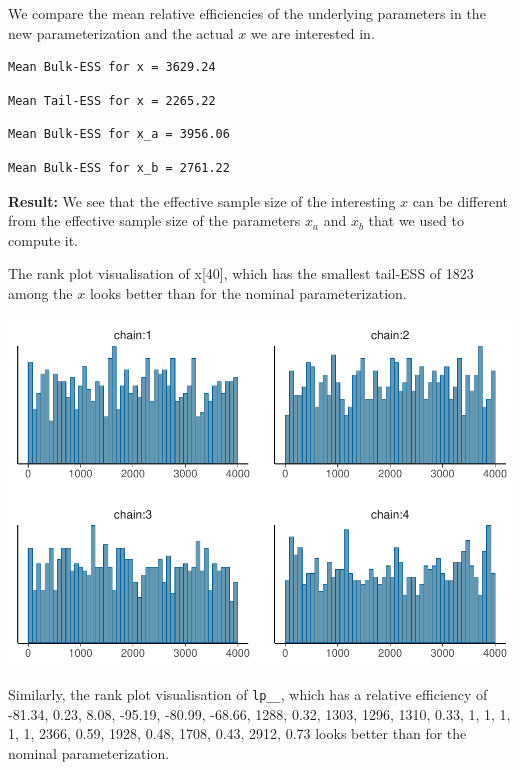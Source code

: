 \documentclass[american,]{article}
\begin{document}
We compare the mean relative efficiencies of the underlying parameters
in the new parameterization and the actual \(x\) we are interested in.

\begin{verbatim}
Mean Bulk-ESS for x = 3629.24
\end{verbatim}

\begin{verbatim}
Mean Tail-ESS for x = 2265.22
\end{verbatim}

\begin{verbatim}
Mean Bulk-ESS for x_a = 3956.06
\end{verbatim}

\begin{verbatim}
Mean Bulk-ESS for x_b = 2761.22
\end{verbatim}

\textbf{Result:} We see that the effective sample size of the
interesting \(x\) can be different from the effective sample size of the
parameters \(x_a\) and \(x_b\) that we used to compute it.

The rank plot visualisation of x{[}40{]}, which has the smallest
tail-ESS of 1823 among the \(x\) looks better than for the nominal
parameterization.

\includegraphics{graphics/hist-fit-alt1-2-1.pdf}

Similarly, the rank plot visualisation of \texttt{lp\_\_}, which has a
relative efficiency of -81.34, 0.23, 8.08, -95.19, -80.99, -68.66, 1288,
0.32, 1303, 1296, 1310, 0.33, 1, 1, 1, 1, 1, 2366, 0.59, 1928, 0.48,
1708, 0.43, 2912, 0.73 looks better than for the nominal
parameterization.
\end{document}
